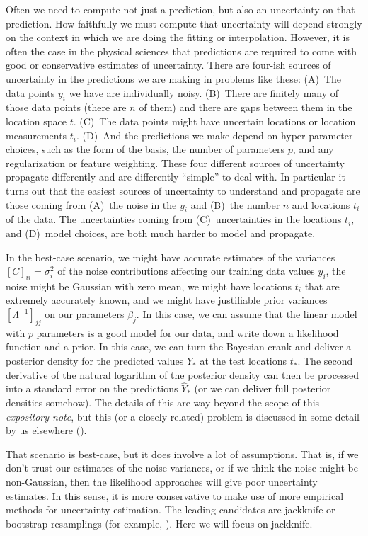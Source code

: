 \documentclass[12pt,letterpaper]{article}
\newcommand{\documentname}{\textsl{expository note}}
\begin{document}
Often we need to compute not just a prediction, but also an uncertainty on that prediction.
How faithfully we must compute that uncertainty will depend strongly on the context in which we are doing the fitting or interpolation.
However, it is often the case in the physical sciences that predictions are required to come with good or conservative estimates of uncertainty.
There are four-ish sources of uncertainty in the predictions we are making in problems like these:
(A)~The data points $y_i$ we have are individually noisy.
(B)~There are finitely many of those data points (there are $n$ of them) and there are gaps between them in the location space $t$.
(C)~The data points might have uncertain locations or location measurements $t_i$.
(D)~And the predictions we make depend on hyper-parameter choices, such as the form of the basis, the number of parameters $p$, and any regularization or feature weighting.
These four different sources of uncertainty propagate differently and are differently ``simple'' to deal with.
In particular it turns out that the easiest sources of uncertainty to understand and propagate are those coming from (A)~the noise in the $y_i$ and (B)~the number $n$ and locations $t_i$ of the data.
The uncertainties coming from (C)~uncertainties in the locations $t_i$, and (D)~model choices, are both much harder to model and propagate.

In the best-case scenario, we might have accurate estimates of the variances $[C]_{ii} = \sigma_i^2$ of the noise contributions affecting our training data values $y_i$, the noise might be Gaussian with zero mean, we might have locations $t_i$ that are extremely accurately known, and we might have justifiable prior variances $[\Lambda^{-1}]_{jj}$ on our parameters $\beta_j$.
In this case, we can assume that the linear model with $p$ parameters is a good model for our data, and write down a likelihood function and a prior.
In this case, we can turn the Bayesian crank and deliver a posterior density for the predicted values $Y_\ast$ at the test locations $t_\ast$.
The second derivative of the natural logarithm of the posterior density can then be processed into a standard error on the predictions $\hat{Y}_\ast$ (or we can deliver full posterior densities somehow).
The details of this are way beyond the scope of this \documentname, but this (or a closely related) problem is discussed in some detail by us elsewhere (\citealt{products}).

That scenario is best-case, but it does involve a lot of assumptions.
That is, if we don't trust our estimates of the noise variances, or if we think the noise might be non-Gaussian, then the likelihood approaches will give poor uncertainty estimates.
In this sense, it is more conservative to make use of more empirical methods for uncertainty estimation.
The leading candidates are jackknife or bootstrap resamplings (for example, \citealt{bootjack}).
Here we will focus on jackknife.
\end{document}
